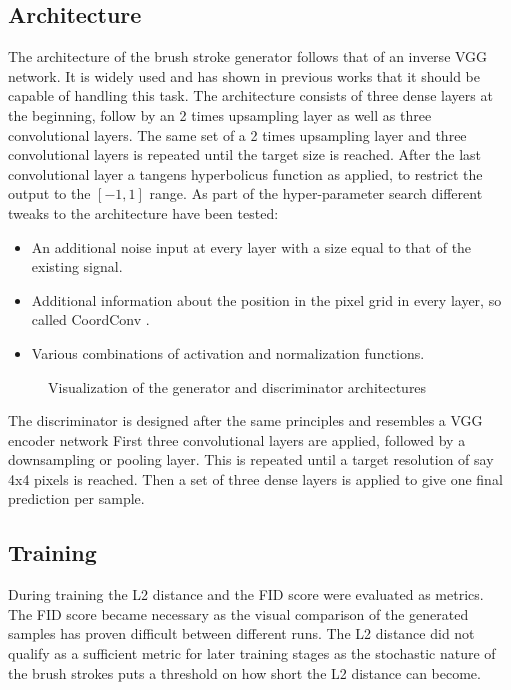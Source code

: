 \subsection{Architecture}
The architecture of the brush stroke generator follows that of an inverse VGG network.
It is widely used and has shown in previous works that it should be capable of handling
this task.
 The architecture consists of three dense layers at the beginning,
follow by an 2 times upsampling layer as well as three convolutional layers.
The same set of a 2 times upsampling layer and three convolutional layers is repeated
until the target size is reached.
After the last convolutional layer a tangens hyperbolicus function as applied, to
restrict the output to the $[-1, 1]$ range.
As part of the hyper-parameter search different tweaks to the architecture have been
tested:
\begin{itemize}
    \item An additional noise input at every layer with a size equal to that of the existing signal.
    \item Additional information about the position in the pixel grid in every layer, so called
        CoordConv \cite{coordconv}.
    \item Various combinations of activation and normalization functions.
\end{itemize}

\begin{figure*}
    \resizebox{1.5\textwidth}{!}{
        
    }
    \resizebox{1.5\textwidth}{!}{
        
    }
        \caption{Visualization of the generator and discriminator architectures}
\end{figure*}

The discriminator is designed after the same principles and resembles a VGG encoder
network
First three convolutional layers are applied, followed by a downsampling or pooling layer.
This is repeated until a target resolution of say 4x4 pixels is reached.
Then a set of three dense layers is applied to give one final prediction per sample.

\subsection{Training}
During training the L2 distance and the FID score were evaluated as metrics.
The FID score became necessary as the visual comparison of the generated samples
has proven difficult between different runs.
The L2 distance did not qualify as a sufficient metric for later training stages
as the stochastic nature of the brush strokes puts a threshold on how short the L2
distance can become.

